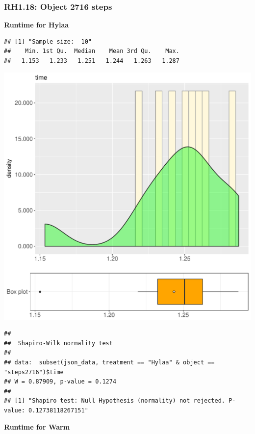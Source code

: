 \documentclass{article}\usepackage[]{graphicx}\usepackage[]{color}
\makeatletter
\def\maxwidth{ %
  \ifdim\Gin@nat@width>\linewidth
    \linewidth
  \else
    \Gin@nat@width
  \fi
}
\newenvironment{kframe}{%
 \def\at@end@of@kframe{}%
 \ifinner\ifhmode%
  \def\at@end@of@kframe{\end{minipage}}%
  \begin{minipage}{\columnwidth}%
 \fi\fi%
 \def\FrameCommand##1{\hskip\@totalleftmargin \hskip-\fboxsep
 \colorbox{shadecolor}{##1}\hskip-\fboxsep
     \hskip-\linewidth \hskip-\@totalleftmargin \hskip\columnwidth}%
 \MakeFramed {\advance\hsize-\width
   \@totalleftmargin\z@ \linewidth\hsize
   \@setminipage}}%
 {\par\unskip\endMakeFramed%
 \at@end@of@kframe}
\newenvironment{knitrout}{}{} %
\makeatother
\begin{document}
\subsubsection{RH1.18: Object 2716 steps}

 \textbf{Runtime for Hylaa}
\begin{knitrout}
\color{fgcolor}\begin{kframe}
\begin{verbatim}
## [1] "Sample size:  10"
##    Min. 1st Qu.  Median    Mean 3rd Qu.    Max. 
##   1.153   1.233   1.251   1.244   1.263   1.287
\end{verbatim}
\end{kframe}
\includegraphics[width=\maxwidth]{figure/RH1_Hylaa_steps2716-1} 
\begin{kframe}\begin{verbatim}
## 
## 	Shapiro-Wilk normality test
## 
## data:  subset(json_data, treatment == "Hylaa" & object == "steps2716")$time
## W = 0.87909, p-value = 0.1274
## 
## [1] "Shapiro test: Null Hypothesis (normality) not rejected. P-value: 0.12738118267151"
\end{verbatim}
\end{kframe}
\end{knitrout}
 \textbf{Runtime for Warm}
\end{document}
